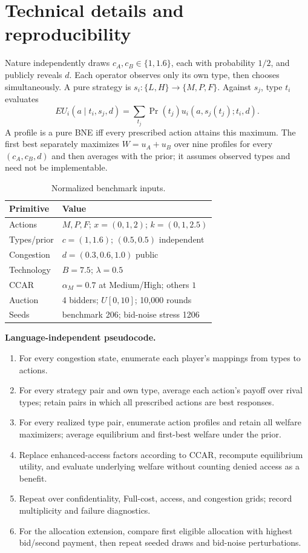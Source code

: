 


\appendix
\section{Technical details and reproducibility}
\label{app:technical}
Nature independently draws $c_A,c_B\in\{1,1.6\}$, each with probability $1/2$, and publicly reveals $d$. Each operator observes only its own type, then chooses simultaneously. A pure strategy is $s_i:\{L,H\}\rightarrow\{M,P,F\}$. Against $s_j$, type $t_i$ evaluates
\[
EU_i(a\mid t_i,s_j,d)=\sum_{t_j}\Pr(t_j)u_i(a,s_j(t_j);t_i,d).
\]
A profile is a pure BNE iff every prescribed action attains this maximum. The first best separately maximizes $W=u_A+u_B$ over nine profiles for every $(c_A,c_B,d)$ and then averages with the prior; it assumes observed types and need not be implementable.

\begin{table}[H]
\caption{Normalized benchmark inputs.}
\centering\small
\begin{tabular}{@{}ll@{}}\toprule
Primitive & Value \\\midrule
Actions & $M,P,F$; $x=(0,1,2)$; $k=(0,1,2.5)$ \\
Types/prior & $c=(1,1.6)$; $(0.5,0.5)$ independent \\
Congestion & $d=(0.3,0.6,1.0)$ public \\
Technology & $B=7.5$; $\lambda=0.5$ \\
CCAR & $\alpha_M=0.7$ at Medium/High; others $1$ \\
Auction & 4 bidders; $U[0,10]$; 10,000 rounds \\
Seeds & benchmark 206; bid-noise stress 1206 \\
\bottomrule\end{tabular}
\end{table}

\noindent\textbf{Language-independent pseudocode.}
\begin{enumerate}
\item For every congestion state, enumerate each player's mappings from types to actions.
\item For every strategy pair and own type, average each action's payoff over rival types; retain pairs in which all prescribed actions are best responses.
\item For every realized type pair, enumerate action profiles and retain all welfare maximizers; average equilibrium and first-best welfare under the prior.
\item Replace enhanced-access factors according to CCAR, recompute equilibrium utility, and evaluate underlying welfare without counting denied access as a benefit.
\item Repeat over confidentiality, Full-cost, access, and congestion grids; record multiplicity and failure diagnostics.
\item For the allocation extension, compare first eligible allocation with highest bid/second payment, then repeat seeded draws and bid-noise perturbations.
\end{enumerate}

